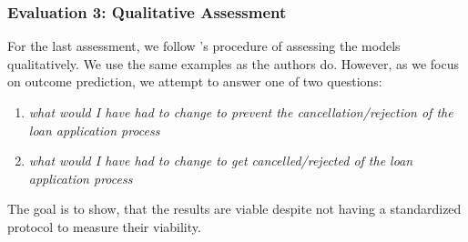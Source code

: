 \documentclass[./../../paper.tex]{subfiles}
\begin{document}
\subsubsection{Evaluation 3: Qualitative Assessment}
For the last assessment, we follow \citeauthor{hsieh_DiCE4ELInterpretingProcess_2021}'s procedure of assessing the models qualitatively. We use the same examples as the authors do. However, as we focus on outcome prediction, we attempt to answer one of two questions: 

\begin{enumerate}
    \item \emph{what would I have had to change to prevent the cancellation/rejection of the loan application process}
    \item \emph{what would I have had to change to get cancelled/rejected of the loan application process}
\end{enumerate}

The goal is to show, that the results are viable despite not having a standardized protocol to measure their viability.
\end{document}
